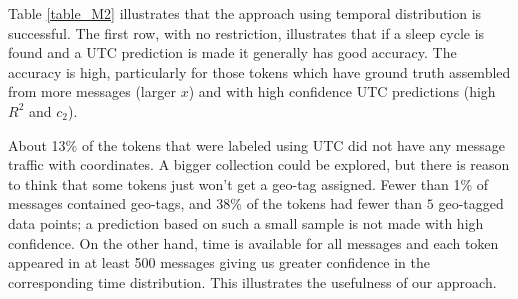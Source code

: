 Table \ref{table_M2} illustrates that the approach using temporal  distribution is successful. 
The first row, with no restriction, illustrates that if a sleep cycle is found and a UTC prediction is made it generally has good accuracy. The accuracy is  high, particularly for those tokens which have ground truth assembled from more messages (larger $x$) and %
with high confidence UTC predictions (high $R^2$ and $c_2$). 

About 13\% of the tokens that were labeled using UTC did not have any message traffic with coordinates. A bigger collection could be explored, but there is reason to think that some tokens %
just won't get a geo-tag assigned. Fewer than 1\% of messages contained geo-tags, and 38\% of the tokens had fewer than $5$ geo-tagged data points; a prediction based on such a small sample is not made with high confidence. On the other hand, time is available for all messages and each token appeared in at least 500 messages giving us greater confidence in the corresponding time distribution.  This illustrates the usefulness of our approach.

